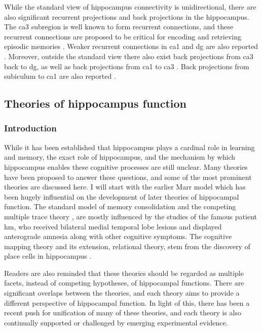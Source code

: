 While the standard view of hippocampus connectivity is unidirectional, there are also significant recurrent projections and back projections in the hippocampus. The \gls{ca3} subregion is well known to form recurrent connections, and these recurrent connections are proposed to be critical for encoding and retrieving episodic memories \citep{nakazawa02, rolls07}. Weaker recurrent connections in \gls{ca1} and \gls{dg} are also reported \citep{swanson81, ishizuka90, buckmaster93}. Moreover, outside the standard view there also exist back projections from \gls{ca3} back to \gls{dg}, as well as back projections from \gls{ca1} to \gls{ca3} \citep{swanson81, li94}. Back projections from subiculum to \gls{ca1} are also reported \citep{finch83}. 

\subsection{Theories of hippocampus function}
\subsubsection{Introduction}
While it has been established that hippocampus plays a cardinal role in learning and memory, the exact role of hippocampus, and the mechanism by which hippocampus enables these cognitive processes are still unclear. Many theories have been proposed to answer these questions, and some of the most prominent theories are discussed here. I will start with the earlier Marr model \citep{marr71} which has been hugely influential on the development of later theories of hippocampal function. The standard model of memory consolidation \citep{squire92} and the competing multiple trace theory \citep{nadel97}, are mostly influenced by the studies of the famous patient \gls{hm}, who received bilateral medial temporal lobe lesions and displayed anterograde amnesia along with other cognitive symptoms. The cognitive mapping theory and its extension, relational theory, stem from the discovery of place cells in hippocampus \citep{o'keefe71}. 

Readers are also reminded that these theories should be regarded as multiple facets, instead of competing hypotheses, of hippocampal functions. There are significant overlaps between the theories, and each theory aims to provide a different perspective of hippocampal function. In light of this, there has been a recent push for unification of many of these theories, and each theory is also continually supported or challenged by emerging experimental evidence.

